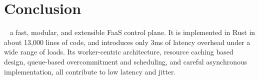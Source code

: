


\begin{comment}
  \section{Discussion}
There are a number of open-sourced FaaS platforms out there now, so why do we feel the need to make and release yet another?
Nearly all the platforms out there are targeted at end users of FaaS, not built with researchers in mind.
The only one to break this trend is OpenLambda~\cite{hendrickson2016serverless}.
We find it insufficient as it is implemented in Go, whose garbage collection we feel is a significant issue in the latency critical environment of FaaS.
Importantly it lacks both the ability to operate as a cluster and an integrated load generation system, both of which we have implemented both in \sysname~.

OpenFaas~\cite{openfaas} and nuclio~\cite{nuclio} both rely on Docker/Kubernetes as their deployment and scaling mechanisms.
These existing tech stacks are highly useful, but limit the research possibilities of a platform, e.g. cold-start optimizations and deploying to edge nodes become intractable.
While \sysname~ does have a Docker implementation, it is to showcase the ability implement multiple containerization mechanisms and compare between them.

OpenWhisk~\cite{openwhisk} also relies on a Docker/Kubernetes setup, and has we have shown above has highly unpredictable performance.
The JVM garbage collection, plus high latency variance coming from both their custom platform pieces and third-party CouchDB and Kafka detract from its capability as a research platform.
We have eliminated the third party services from the invocation path, and our design and Rust implementation contribute to the low-overhead low-variance of the platform.
\end{comment}

\section{Conclusion}
\sysname~ a fast, modular, and extensible FaaS control plane. 
It is implemented in Rust in about 13,000 lines of code, and introduces only 3ms of latency overhead under a wide range of loads.
Its worker-centric architecture, resource caching based design, queue-based overcommitment and scheduling, and careful asynchronous implementation, all contribute to low latency and jitter. 

